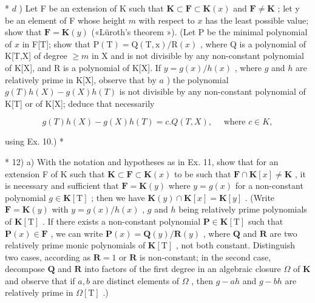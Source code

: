 * \(d\) ) Let F be an extension of K such that \(\mathbf{K} \subset \mathbf{F} \subset \mathbf{K}(x)\) and \(\mathbf{F} \neq \mathbf{K}\) ; let y be an element of F whose height \(m\) with respect to \(x\) has the least possible value; show that \(\mathbf{F} = \mathbf{K}(y)\) («Lüroth's theorem »). (Let P be the minimal polynomial of \(x\) in F{[}T{]}; show that \(\mathrm{P(T)} = \mathrm{Q(T,x)}/\mathrm{R}(x)\) , where Q is a polynomial of K{[}T,X{]} of degree \(\geqslant m\) in X and is not divisible by any non-constant polynomial of K{[}X{]}, and R is a polynomial of K{[}X{]}. If \(y = g(x)/h(x)\) , where \(g\) and \(h\) are relatively prime in K{[}X{]}, observe that by \(a\) ) the polynomial \(g(T)h(X) - g(X)h(T)\) is not divisible by any non-constant polynomial of K{[}T{]} or of K{[}X{]}; deduce that necessarily

\[
g (T) h (X) - g (X) h (T) = c. Q (T, X), \quad \text { where } c \in K,
\]

using Ex. 10.) *

* 12) a) With the notation and hypotheses as in Ex. 11, show that for an extension F of K such that \(\mathbf{K} \subset \mathbf{F} \subset \mathbf{K}(x)\) to be such that \(\mathbf{F} \cap \mathbf{K}[x] \neq \mathbf{K}\) , it is necessary and sufficient that \(\mathbf{F} = \mathbf{K}(y)\) where \(y = g(x)\) for a non-constant polynomial \(g \in \mathbf{K}[\mathrm{T}]\) ; then we have \(\mathbf{K}(y) \cap \mathbf{K}[x] = \mathbf{K}[y]\) . (Write \(\mathbf{F} = \mathbf{K}(y)\) with \(y = g(x)/h(x)\) , \(g\) and \(h\) being relatively prime polynomials of \(\mathbf{K}[\mathrm{T}]\) . If there exists a non-constant polynomial \(\mathbf{P} \in \mathbf{K}[\mathrm{T}]\) such that \(\mathbf{P}(x) \in \mathbf{F}\) , we can write \(\mathbf{P}(x) = \mathbf{Q}(y)/\mathbf{R}(y)\) , where \(\mathbf{Q}\) and \(\mathbf{R}\) are two relatively prime monic polynomials of \(\mathbf{K}[\mathrm{T}]\) , not both constant. Distinguish two cases, according as \(\mathbf{R} = 1\) or \(\mathbf{R}\) is non-constant; in the second case, decompose \(\mathbf{Q}\) and \(\mathbf{R}\) into factors of the first degree in an algebraic closure \(\Omega\) of \(\mathbf{K}\) and observe that if \(a, b\) are distinct elements of \(\Omega\) , then \(g - ah\) and \(g - bh\) are relatively prime in \(\Omega[\mathrm{T}]\) .)

